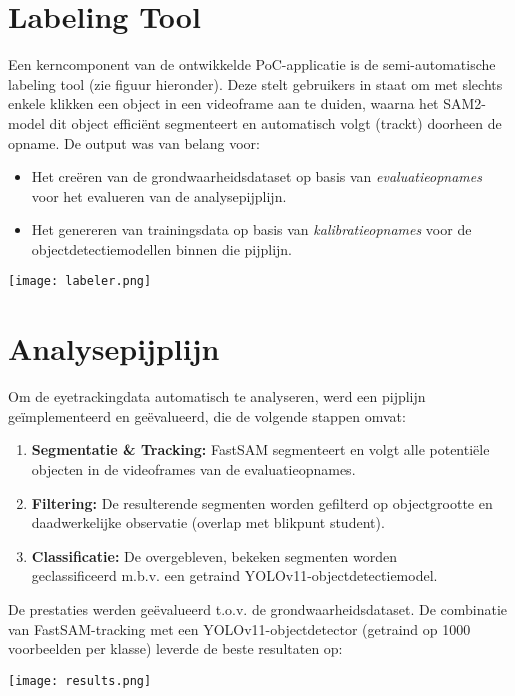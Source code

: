 \documentclass[a0,portrait]{hogent-poster}
\begin{document}
\begin{multicols}{2}
\section{Labeling Tool}
Een kerncomponent van de ontwikkelde PoC-applicatie is de semi-automatische labeling tool (zie figuur hieronder). 
Deze stelt gebruikers in staat om met slechts enkele klikken een object in een videoframe aan te duiden, 
waarna het SAM2-model dit object efficiënt segmenteert en automatisch volgt (trackt) doorheen de opname. 
De output was van belang voor:
\begin{itemize}
  \item Het creëren van de grondwaarheidsdataset op basis van \textit{evaluatieopnames} voor het evalueren van de analysepijplijn.
  \item Het genereren van trainingsdata op basis van \textit{kalibratieopnames} voor de objectdetectiemodellen binnen die pijplijn.
\end{itemize}

\begin{center}
  \captionsetup{type=figure}
  \texttt{[image: labeler.png]}
\end{center}

\section{Analysepijplijn}
Om de eyetrackingdata automatisch te analyseren, werd een pijplijn geïmplementeerd en geëvalueerd, die de volgende stappen omvat:
\begin{enumerate}
    \item \textbf{Segmentatie \& Tracking:} FastSAM segmenteert en volgt alle potentiële objecten in de videoframes van de evaluatieopnames.
    \item \textbf{Filtering:} De resulterende segmenten worden gefilterd op objectgrootte en daadwerkelijke observatie (overlap met blikpunt student).
    \item \textbf{Classificatie:} De overgebleven, bekeken segmenten worden\\ geclassificeerd m.b.v. een getraind YOLOv11-objectdetectiemodel.
\end{enumerate}
De prestaties werden geëvalueerd t.o.v. de grondwaarheidsdataset. De combinatie van FastSAM-tracking met een YOLOv11-objectdetector (getraind op 1000 voorbeelden per klasse) leverde de beste resultaten op:
\begin{center}
  \captionsetup{type=figure}
  \texttt{[image: results.png]}
\end{center}


\end{multicols}
\end{document}
